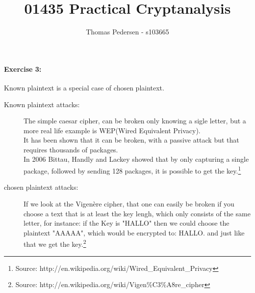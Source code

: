 \documentclass[10pt,a4paper]{article}
\title{01435 Practical Cryptanalysis}
\author{Thomas Pedersen - s103665}
\def\Code#1{\texttt{#1}}
\begin{document}
\maketitle





\paragraph{Exercise 3:}
Known plaintext is a special case of chosen plaintext.
\begin{description}
\item[Known plaintext attacks:]
The simple caesar cipher, can be broken only knowing a sigle letter, but a more real life example is WEP(Wired Equivalent Privacy).\\
It has been shown that it can be broken, with a passive attack but that requires thousands of packages.\\
In 2006 Bittau, Handly and Lackey showed that by only capturing a single package, followed by sending 128 packages, it is possible to get the key.\footnote{Source: http://en.wikipedia.org/wiki/Wired\_Equivalent\_Privacy}

\item[chosen plaintext attacks:] If we look at the Vigenère cipher, that one can easily be broken if you choose a text that is at least the key lengh, which only consists of the same letter, for instance: if the Key is "HALLO" then we could choose the plaintext "AAAAA", which would be encrypted to: HALLO. and just like that we get the key.\footnote{Source: http://en.wikipedia.org/wiki/Vigen\%C3\%A8re\_cipher
}

\end{description}
\end{document}
